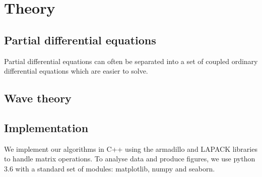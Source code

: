 \section{Theory}
\label{sec:theory}

\subsection{Partial differential equations}
\label{sec:pde}
Partial differential equations can often be separated into a set of coupled ordinary differential equations which are easier to solve.


\subsection{Wave theory}
\label{sec:wave}

\subsection{Implementation}
\label{sec:implement}
We implement our algorithms in C++ using the armadillo and LAPACK libraries to handle matrix operations. To analyse data and produce figures, we use python 3.6 with a standard set of modules: matplotlib, numpy and seaborn.

